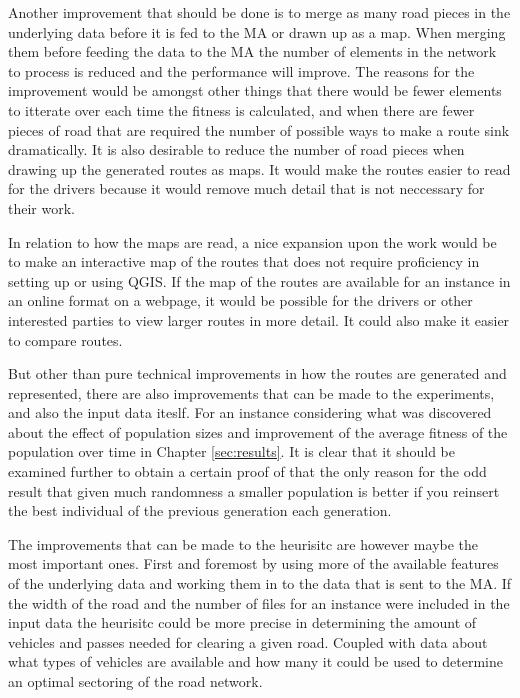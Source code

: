 Another improvement that should be done is to merge as many road pieces in the underlying data before it is fed to the MA or drawn up as a map. When merging them before feeding the data to the MA the number of elements in the network to process is reduced and the performance will improve. The reasons for the improvement would be amongst other things that there would be fewer elements to itterate over each time the fitness is calculated, and when there are fewer pieces of road that are required the number of possible ways to make a route sink dramatically. It is also desirable to reduce the number of road pieces when drawing up the generated routes as maps. It would make the routes easier to read for the drivers because it would remove much detail that is not neccessary for their work.

In relation to how the maps are read, a nice expansion upon the work would be to make an interactive map of the routes that does not require proficiency in setting up or using QGIS. If the map of the routes are available for an instance in an online format on a webpage, it would be possible for the drivers or other interested parties to view larger routes in more detail. It could also make it easier to compare routes.

But other than pure technical improvements in how the routes are generated and represented, there are also improvements that can be made to the experiments, and also the input data iteslf. For an instance considering what was discovered about the effect of population sizes and improvement of the average fitness of the population over time in Chapter \ref{sec:results}. It is clear that it should be examined further to obtain a certain proof of that the only reason for the odd result that given much randomness a smaller population is better if you reinsert the best individual of the previous generation each generation.

The improvements that can be made to the heurisitc are however maybe the most important ones. First and foremost by using more of the available features of the underlying data and working them in to the data that is sent to the MA. If the width of the road and the number of files for an instance were included in the input data the heurisitc could be more precise in determining the amount of vehicles and passes needed for clearing a given road. Coupled with data about what types of vehicles are available and how many it could be used to determine an optimal sectoring of the road network.

